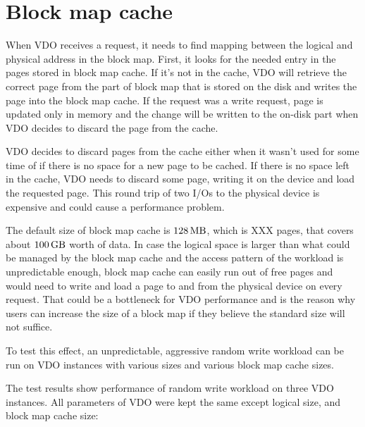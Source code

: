 \documentclass[
  color, %
  table, %
  lof,   %
  lot,   %
]{fithesis3}
\begin{document}
\section{Block map cache}

When VDO receives a request, it needs to find mapping between the logical and physical address in the block map. First, it looks for the needed entry in the pages stored in block map cache. If it's not in the cache, VDO will retrieve the correct page from the part of block map that is stored on the disk and writes the page into the block map cache. If the request was a write request, page is updated only in memory and the change will be written to the on-disk part when VDO decides to discard the page from the cache.

VDO decides to discard pages from the cache either when it wasn't used for some time of if there is no space for a new page to be cached. If there is no space left in the cache, VDO needs to discard some page, writing it on the device and load the requested page. This round trip of two I/Os to the physical device is expensive and could cause a performance problem.

The default size of block map cache is $\SI{128}{\mega\byte}$, which is XXX pages, that covers about $\SI{100}{\giga\byte}$ worth of data. In case the logical space is larger than what could be managed by the block map cache and the access pattern of the workload is unpredictable enough, block map cache can easily run out of free pages and would need to write and load a page to and from the physical device on every request. That could be a bottleneck for VDO performance and is the reason why users can increase the size of a block map if they believe the standard size will not suffice.

To test this effect, an unpredictable, aggressive random write workload can be run on VDO instances with various sizes and various block map cache sizes.

The test results show performance of random write workload on three VDO instances. All parameters of VDO were kept the same except logical size, and block map cache size:
\end{document}
